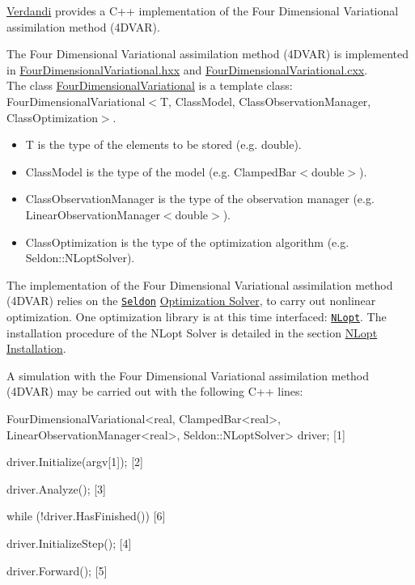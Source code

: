 \documentclass{tufte-book}
\begin{document}
\hyperlink{namespace_verdandi}{\-Verdandi} provides a \-C++ implementation of the \-Four \-Dimensional \-Variational assimilation method (4\-D\-V\-A\-R).

\-The \-Four \-Dimensional \-Variational assimilation method (4\-D\-V\-A\-R) is implemented in {\ttfamily \hyperlink{_four_dimensional_variational_8hxx_source}{\-Four\-Dimensional\-Variational.\-hxx}} and {\ttfamily \hyperlink{_four_dimensional_variational_8cxx_source}{\-Four\-Dimensional\-Variational.\-cxx}}.\\
 \-The class {\ttfamily  \hyperlink{class_verdandi_1_1_four_dimensional_variational}{\-Four\-Dimensional\-Variational}} is a template class\-: \\
 {\ttfamily \-Four\-Dimensional\-Variational$<$\-T, \-Class\-Model, \-Class\-Observation\-Manager, \-Class\-Optimization$>$}.
 \begin{itemize}
 \item {\ttfamily \-T} is the type of the elements to be stored (e.\-g. {\ttfamily double}).
 \item {\ttfamily \-Class\-Model} is the type of the model (e.\-g. {\ttfamily \-Clamped\-Bar$<$double$>$}).
 \item {\ttfamily \-Class\-Observation\-Manager} is the type of the observation manager (e.\-g. {\ttfamily \-Linear\-Observation\-Manager$<$double$>$}).
 \item {\ttfamily \-Class\-Optimization} is the type of the optimization algorithm (e.\-g. {\ttfamily \-Seldon\-::\-N\-Lopt\-Solver}).
 \end{itemize}
\-The implementation of the \-Four \-Dimensional \-Variational assimilation method (4\-D\-V\-A\-R) relies on the \href{http://www.seldon.sourceforge.net}{\tt \-Seldon} \hyperlink{optimization_solver}{\-Optimization \-Solver}, to carry out nonlinear optimization. \-One optimization library is at this time interfaced\-: \href{http://ab-initio.mit.edu/wiki/index.php/NLopt}{\tt \-N\-Lopt}. \-The installation procedure of the \-N\-Lopt \-Solver is detailed in the section \hyperlink{optimization_solver_nlopt_installation}{\-N\-Lopt \-Installation}.

\-A simulation with the \-Four \-Dimensional \-Variational assimilation method (4\-D\-V\-A\-R) may be carried out with the following \-C++ lines\-:

 \begin{frame_cpp}
FourDimensionalVariational<real, ClampedBar<real>,
        LinearObservationManager<real>, Seldon::NLoptSolver> driver; [1]

driver.Initialize(argv[1]); [2]

driver.Analyze(); [3]

while (!driver.HasFinished()) [6]
{
    driver.InitializeStep(); [4]

    driver.Forward(); [5]
}
\end{frame_cpp}
\end{document}
